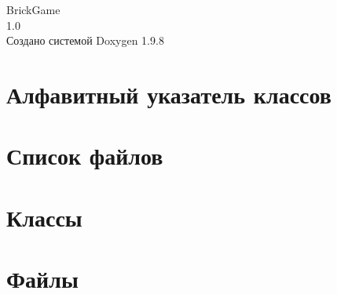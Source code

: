 \documentclass[twoside]{book}
\newcommand{\+}{\discretionary{\mbox{\scriptsize$\hookleftarrow$}}{}{}}
\newcommand{\clearemptydoublepage}{%
    \newpage{\pagestyle{empty}\cleardoublepage}%
  }
\begin{document}
  \raggedbottom
    \hypersetup{pageanchor=false,
                bookmarksnumbered=true,
                pdfencoding=unicode
               }
  \begin{titlepage}
  \vspace*{7cm}
  \begin{center}%
  {\Large Brick\+Game}\\
  [1ex]\large 1.\+0 \\
  \vspace*{1cm}
  {\large Создано системой Doxygen 1.9.8}\\
  \end{center}
  \end{titlepage}
  \clearemptydoublepage
  \tableofcontents
  \clearemptydoublepage
  \hypersetup{pageanchor=true}

\chapter{Алфавитный указатель классов}

\chapter{Список файлов}

\chapter{Классы}



\chapter{Файлы}


















  \backmatter
  \newpage
  \clearemptydoublepage
  \printindex
\end{document}
